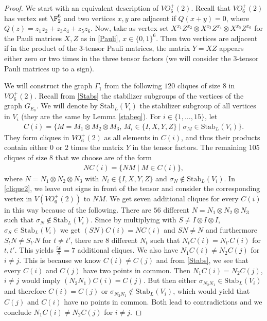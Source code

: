 \begin{proof}
We start with an equivalent description of $VO_6^+(2)$. Recall that $VO_6^+(2)$ has vertex set $\F_2^6$ and two vertices $x,y$ are adjacent if $Q(x+y)=0$, where $Q(z)=z_1z_2+z_3z_4+z_5z_6$. Now, take as vertex set $X^{x_1}Z^{x_2}\otimes X^{x_3}Z^{x_4}\otimes X^{x_5}Z^{x_6}$ for the Pauli matrices $X, Z$ as in \eqref{Pauli}, $x\in \{0,1\}^6$. Then two vertices are adjacent if in the product of the $3$-tensor Pauli matrices, the matrix $Y=XZ$ appears either zero or two times in the three tensor factors (we will consider the $3$-tensor Pauli matrices up to a sign). 

We will construct the graph $\Gamma_1$ from the following $120$ cliques of size $8$ in $VO_6^+(2)$. 
Recall from \eqref{Stabs} the stabilizer subgroups of the vertices of the graph $G_{E_8}$. We will denote by $\mathrm{Stab}_L(V_i)$ the stabilizer subgroup of all vertices in $V_i$ (they are the same by Lemma \ref{stabeq}). For $i \in \{1,\dots, 15\}$, let 
\begin{align}\label{clique1}
   C(i)=\{M=M_1\otimes M_2 \otimes M_3,\, M_i\in \{I,X,Y,Z\} \mid \sigma_M \in \mathrm{Stab}_L(V_i)\}.
\end{align}
They form cliques in $VO_6^+(2)$ as all elements in $C(i)$, and thus their products contain either $0$ or $2$ times the matrix $Y$ in the tensor factors. The remaining $105$ cliques of size $8$ that we choose are of the form
\begin{align}\label{clique2}
    NC(i)=\{NM \mid M \in C(i)\},
\end{align}
where $N=N_1\otimes N_2 \otimes N_3$ with $N_i\in \{I,X,Y,Z\}$ and $\sigma_N \notin \mathrm{Stab}_L(V_i)$. In \eqref{clique2}, we leave out signs in front of the tensor and consider the corresponding vertex in $V(VO_6^+(2))$ to $NM$. We get seven additional cliques for every $C(i)$ in this way because of the following. There are $56$ different $N=N_1\otimes N_2 \otimes N_3$ such that $\sigma_N \notin \mathrm{Stab}_L(V_i)$. Since by multiplying with $S\neq I\otimes I \otimes I$, $\sigma_S \in \mathrm{Stab}_L(V_i)$ we get $(SN)C(i)=NC(i)$ and $SN\neq N$ and furthermore $S_tN\neq S_{t'}N$ for $t\neq t'$, there are $8$ different $N_t$ such that $N_tC(i)=N_{t'}C(i)$ for $t,t'$. This yields $\frac{56}{8}=7$ additional cliques. We also have $N_1C(i)\neq N_2C(j)$ for $i\neq j$. This is because we know $C(i)\neq C(j)$ and from \eqref{Stabs}, we see that every $C(i)$ and $C(j)$ have two points in common. Then $N_1C(i)=N_2C(j)$, $i\neq j$ would imply $(N_2N_1)C(i)=C(j)$. But then either $\sigma_{N_2N_1}\in \mathrm{Stab}_L(V_i)$ and therefore $C(i)=C(j)$ or $\sigma_{N_2N_1}\notin \mathrm{Stab}_L(V_i)$, which would yield that $C(j)$ and $C(i)$ have no points in common. Both lead to contradictions and we conclude $N_1C(i)\neq N_2C(j)$ for $i\neq j$.
 

\end{proof}
